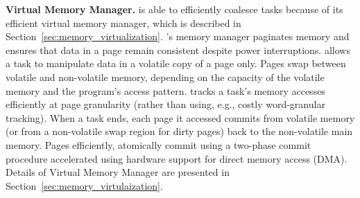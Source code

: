 \textbf{\sys Virtual Memory Manager.} \sys is able to efficiently coalesce tasks because of its efficient virtual memory manager, which is described in Section~\ref{sec:memory_virtualization}. \sys's memory manager paginates memory and ensures that data in a page remain consistent despite power interruptions. \sys allows a task to manipulate data in a volatile copy of a page only. Pages swap between volatile and non-volatile memory, depending on the capacity of the volatile memory and the program's access pattern. \sys tracks a task's memory accesses efficiently at page granularity (rather than using, e.g., costly word-granular tracking). When a task ends, each page it accessed commits from volatile memory (or from a non-volatile swap region for dirty pages) back to the non-volatile main memory. Pages efficiently, atomically commit using a two-phase commit procedure accelerated using hardware support for direct memory access (DMA). Details of Virtual Memory Manager are presented in Section~\ref{sec:memory_virtulaization}.